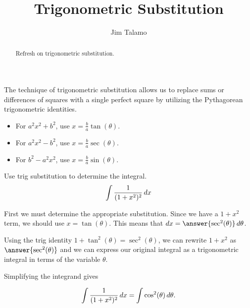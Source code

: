 \documentclass{ximera}
\title[Refresh:]{Trigonometric Substitution}
\author{Jim Talamo}
\begin{document}
\begin{abstract}
 Refresh on trigonometric substitution.
\end{abstract}
\maketitle


\begin{exercise}
The technique of trigonometric substitution allows us to replace sums or differences of squares with a single perfect square by utilizing the Pythagorean trigonometric identities.  

\begin{itemize}
\item For $a^2x^2+b^2$, use $x= \frac{b}{a} \tan(\theta)$.
\item For $a^2x^2-b^2$, use $x= \frac{b}{a} \sec(\theta)$.
\item For $b^2-a^2x^2$, use $x= \frac{b}{a} \sin(\theta)$.
\end{itemize}
 
\begin{example}
Use trig substitution to determine the integral.
\[
\int \frac{1}{(1+x^2)^2} \mathop{}\!d x
\]

First we must determine the appropriate substitution.  Since we have a $1+x^2$ term, we should use $x=\tan(\theta)$.  This means that $\d x= \answer{ \sec^{2}(\theta)} \d \theta$. 

Using the trig identity $1+\tan^2(\theta)=\sec^{2}(\theta)$, we can rewrite $1+x^2$ as $\answer{\sec^{2}(\theta)}$ and we can express our original integral as a trigonometric integral in terms of the variable $\theta$. 

\begin{image}
  \end{image}

Simplifying the integrand gives

\[
\int \frac{1}{(1+x^2)^2} \mathop{}\!d x  = \int \cos^2(\theta) \mathop{}\!d \theta.
\]


\end{example}
\end{exercise}
\end{document}
